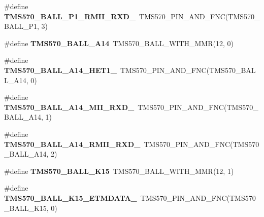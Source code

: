 \begin{DoxyCompactItemize}
\item 
\mbox{\label{tms570ls3137zwt-pins_8h_a044c553ee82a977879a6245ff60a5a0a}} 
\#define {\bfseries T\+M\+S570\+\_\+\+B\+A\+L\+L\+\_\+\+P1\+\_\+\+R\+M\+I\+I\+\_\+\+R\+X\+D\+\_}~T\+M\+S570\+\_\+\+P\+I\+N\+\_\+\+A\+N\+D\+\_\+\+F\+NC(T\+M\+S570\+\_\+\+B\+A\+L\+L\+\_\+\+P1, 3)
\item 
\mbox{\label{tms570ls3137zwt-pins_8h_ae013a9ee114fabeb3f4bc953863df820}} 
\#define {\bfseries T\+M\+S570\+\_\+\+B\+A\+L\+L\+\_\+\+A14}~T\+M\+S570\+\_\+\+B\+A\+L\+L\+\_\+\+W\+I\+T\+H\+\_\+\+M\+MR(12, 0)
\item 
\mbox{\label{tms570ls3137zwt-pins_8h_a7a2714b05d1e1cb159ce0b7abd97f3ad}} 
\#define {\bfseries T\+M\+S570\+\_\+\+B\+A\+L\+L\+\_\+\+A14\+\_\+\+H\+E\+T1\+\_}~T\+M\+S570\+\_\+\+P\+I\+N\+\_\+\+A\+N\+D\+\_\+\+F\+NC(T\+M\+S570\+\_\+\+B\+A\+L\+L\+\_\+\+A14, 0)
\item 
\mbox{\label{tms570ls3137zwt-pins_8h_a8a23bd4b4c9250e21cebf5d2e9c5e33a}} 
\#define {\bfseries T\+M\+S570\+\_\+\+B\+A\+L\+L\+\_\+\+A14\+\_\+\+M\+I\+I\+\_\+\+R\+X\+D\+\_}~T\+M\+S570\+\_\+\+P\+I\+N\+\_\+\+A\+N\+D\+\_\+\+F\+NC(T\+M\+S570\+\_\+\+B\+A\+L\+L\+\_\+\+A14, 1)
\item 
\mbox{\label{tms570ls3137zwt-pins_8h_a999276c5faa638e0d2fc3cdb66fcb2c4}} 
\#define {\bfseries T\+M\+S570\+\_\+\+B\+A\+L\+L\+\_\+\+A14\+\_\+\+R\+M\+I\+I\+\_\+\+R\+X\+D\+\_}~T\+M\+S570\+\_\+\+P\+I\+N\+\_\+\+A\+N\+D\+\_\+\+F\+NC(T\+M\+S570\+\_\+\+B\+A\+L\+L\+\_\+\+A14, 2)
\item 
\mbox{\label{tms570ls3137zwt-pins_8h_aa5d8eb1226f755772d276bbb28cd9fc7}} 
\#define {\bfseries T\+M\+S570\+\_\+\+B\+A\+L\+L\+\_\+\+K15}~T\+M\+S570\+\_\+\+B\+A\+L\+L\+\_\+\+W\+I\+T\+H\+\_\+\+M\+MR(12, 1)
\item 
\mbox{\label{tms570ls3137zwt-pins_8h_a6abf2d88ba42097d22c416eb3ec99c76}} 
\#define {\bfseries T\+M\+S570\+\_\+\+B\+A\+L\+L\+\_\+\+K15\+\_\+\+E\+T\+M\+D\+A\+T\+A\+\_}~T\+M\+S570\+\_\+\+P\+I\+N\+\_\+\+A\+N\+D\+\_\+\+F\+NC(T\+M\+S570\+\_\+\+B\+A\+L\+L\+\_\+\+K15, 0)
\item 

\end{DoxyCompactItemize}
